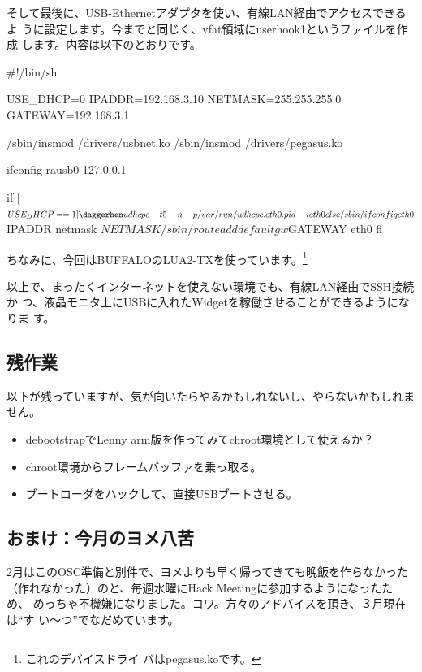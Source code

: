 \documentclass[mingoth,a4paper]{jsarticle}
\begin{document}
そして最後に、USB-Ethernetアダプタを使い、有線LAN経由でアクセスできるよ
うに設定します。今までと同じく、vfat領域にuserhook1というファイルを作成
します。内容は以下のとおりです。
\begin{commandline}
#!/bin/sh

USE_DHCP=0
IPADDR=192.168.3.10
NETMASK=255.255.255.0
GATEWAY=192.168.3.1

/sbin/insmod /drivers/usbnet.ko
/sbin/insmod /drivers/pegasus.ko

ifconfig rausb0 127.0.0.1

if [ $USE_DHCP == 1 ]\daggerhen
   udhcpc -t 5 -n -p /var/run/udhcpc.eth0.pid -i eth0
else
   /sbin/ifconfig eth0 $IPADDR netmask $NETMASK
   /sbin/route add default gw $GATEWAY eth0
fi 
\end{commandline}
ちなみに、今回はBUFFALOのLUA2-TXを使っています。\footnote{これのデバイスドライ
バはpegasus.koです。}

以上で、まったくインターネットを使えない環境でも、有線LAN経由でSSH接続か
つ、液晶モニタ上にUSBに入れたWidgetを稼働させることができるようになりま
す。
\subsection{残作業}
以下が残っていますが、気が向いたらやるかもしれないし、やらないかもしれません。
\begin{itemize}
\item debootstrapでLenny arm版を作ってみてchroot環境として使えるか？
\item chroot環境からフレームバッファを乗っ取る。
\item ブートローダをハックして、直接USBブートさせる。
\end{itemize}
\subsection{おまけ：今月のヨメ八苦}
2月はこのOSC準備と別件で、ヨメよりも早く帰ってきても晩飯を作らなかった
（作れなかった）のと、毎週水曜にHack Meetingに参加するようになったため、
めっちゃ不機嫌になりました。コワ。方々のアドバイスを頂き、３月現在は``す
い〜つ''でなだめています。
\end{document}
